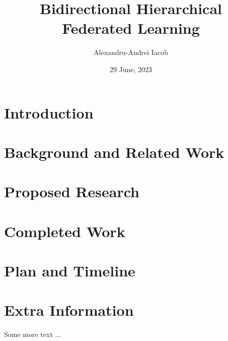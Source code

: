 \documentclass[times, withindex,glossary, backrefs, firstyr]{cam-thesis}
\title{Bidirectional Hierarchical Federated Learning}
\author{Alexandru-Andrei Iacob}
\date{29 June, 2023}
\begin{document}
\frontmatter{}



\chapter{Introduction}

\chapter{Background and Related Work}\label{sec:back}

\chapter{Proposed Research}\label{sec:proposal}

\chapter{Completed Work}\label{sec:completed_work}

\chapter{Plan and Timeline}\label{sec:timeplan}



\renewcommand{\bibname}{References}
\cleardoublepage
{}
{}






\appendix

\chapter{Extra Information}
Some more text ...



\printthesisindex
\end{document}
